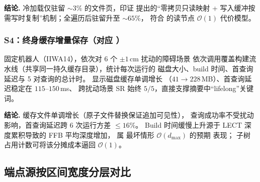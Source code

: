 \documentclass[journal]{IEEEtran}
\begin{document}
\textbf{结论.} 冷加载仅驻留 $\sim\!3\%$ 的文件页，印证
 提出的“零拷贝只读映射 + 写入缓冲按需写时复制”机制；全遍历后驻留升至 $\sim\!65\%$，
符合  的读节点 $\mathcal{O}(1)$ 代价模型。

\subsubsection{S4：终身缓存增量保存（对应 ）}
固定机器人（IIWA14），依次对 6 个 $\pm 1$\,cm 扰动的障碍场景
依次调用覆盖构建流水线（共享同一持久缓存目录），统计每次运行的
磁盘大小、build 时间、首查询延迟与 5 对查询的总计时。
 显示磁盘缓存单调增长
（$41\!\to\!228$\,MB）、首查询延迟稳定在 $115\text{–}150$\,ms、
跨扰动场景 SR 始终 $5/5$，直接支撑摘要中“lifelong”关键词。

\begin{table}[ht]
\centering
\caption{S4 — 连续 6 次跨场景 build 的终身缓存行为（同机器人，$\pm 1$\,cm 障碍物扰动）。}
\label{tab:s4_lifelong}
\end{table}

\textbf{结论.} 缓存文件单调增长（原子文件替换保证追加可见性），
查询成功率不受扰动影响，首查询延迟跨 6 次运行方差 $\leq 16\%$。
Build 时间缓慢上升源于 LECT 深度累积导致的 FFB 平均深度增加，
属  最坏情形 $\mathcal{O}(d_\text{max})$ 的预期
表现； 子树占用计数可将该分摊成本逼回
$\mathcal{O}(1)$。

\subsection{端点源按区间宽度分层对比}\label{sec:exp_ep_width_zh}
\end{document}
